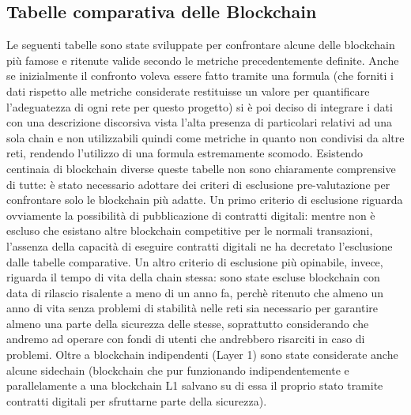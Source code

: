 \documentclass[a4paper, 12pt]{article}
\begin{document}
\subsection*{Tabelle comparativa delle Blockchain}
Le seguenti tabelle sono state sviluppate per confrontare alcune delle blockchain più famose e ritenute valide secondo le metriche precedentemente definite.
Anche se inizialmente il confronto voleva essere fatto tramite una formula (che forniti i dati rispetto alle metriche considerate restituisse un valore per quantificare l'adeguatezza di ogni rete per
questo progetto) si è poi deciso di integrare i dati con una descrizione discorsiva vista l'alta presenza di particolari relativi ad una sola chain e non utilizzabili quindi come metriche in quanto non condivisi da altre reti, rendendo l'utilizzo di una formula estremamente scomodo.
Esistendo centinaia di blockchain diverse queste tabelle non sono chiaramente comprensive di tutte: è stato necessario adottare dei criteri di esclusione pre-valutazione per confrontare
solo le blockchain più adatte.
Un primo criterio di esclusione riguarda ovviamente la possibilità di pubblicazione di contratti digitali: mentre non è escluso che esistano altre blockchain competitive
per le normali transazioni, l'assenza della capacità di eseguire contratti digitali ne ha decretato l'esclusione dalle tabelle comparative.
Un altro criterio di esclusione più opinabile, invece, riguarda il tempo di vita della chain stessa: sono state escluse blockchain con data di rilascio risalente a meno di un anno fa,
perchè ritenuto che almeno un anno di vita senza problemi di stabilità nelle reti sia necessario per garantire almeno una parte della sicurezza delle stesse, soprattutto
considerando che andremo ad operare con fondi di utenti che andrebbero risarciti in caso di problemi.
Oltre a blockchain indipendenti (Layer 1) sono state considerate anche alcune sidechain (blockchain che pur funzionando indipendentemente e parallelamente a una blockchain L1 salvano su di essa il proprio stato tramite contratti digitali per sfruttarne parte della sicurezza).

\renewcommand\arraystretch{1.6}
\end{document}
